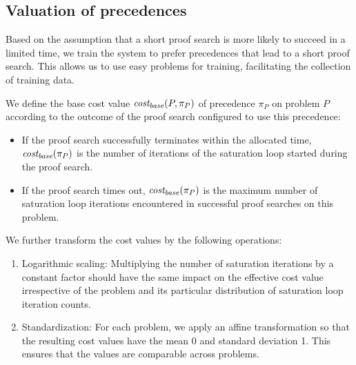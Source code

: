 
\subsection{Valuation of precedences}
\label{sec:precedence-valuation}

Based on the assumption that a short proof search is more likely to succeed in a limited time\cite{?},
we train the system to prefer precedences that lead to a short proof search.
This allows us to use easy problems for training, facilitating the collection of training data.

We define the base cost
value \(\operatorname{\mathit{cost_{base}}}(P, \pi_P)\) of precedence \(\pi_P\) on problem \(P\)
according to the outcome of the proof search configured to use this precedence:

\begin{itemize}
	\item If the proof search successfully terminates within the allocated time,
	\(\operatorname{\mathit{cost_{base}}}(\pi_P)\) is the number of iterations of the saturation loop
	started during the proof search.
	\item If the proof search times out, \(\operatorname{\mathit{cost_{base}}}(\pi_P)\) is the maximum number
	of saturation loop iterations encountered in successful proof searches on this problem.
\end{itemize}

We further transform the cost values by the following operations:

\begin{enumerate}
	\item Logarithmic scaling: Multiplying the number of saturation iterations by a constant factor
	should have the same impact on the effective cost value
	irrespective of the problem and its particular distribution of saturation loop iteration counts.
	\item Standardization\cite{?}: For each problem,
	we apply an affine transformation so that the resulting cost values
	have the mean 0 and standard deviation 1.
	This ensures that the values are comparable across problems.
\end{enumerate}


